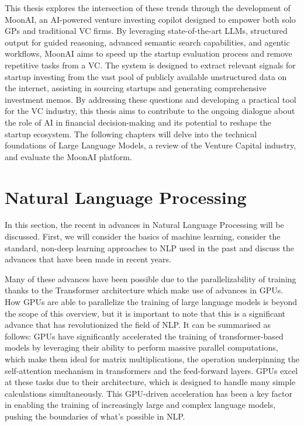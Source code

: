 \documentclass[a4paper, oneside]{discothesis}
\begin{document}
This thesis explores the intersection of these trends through the development of MoonAI, an
AI-powered venture investing copilot designed to empower both solo GPs and traditional VC firms.
By leveraging state-of-the-art LLMs, structured output for guided reasoning, advanced
semantic search capabilities, and agentic workflows, MoonAI aims to speed up the startup evaluation process and remove repetitive tasks from a VC. The
system is designed to extract relevant signals for startup investing from the vast pool of
publicly available unstructured data on the internet, assisting in sourcing startups and
generating comprehensive investment memos. By addressing these questions and developing a practical tool for the VC industry, this thesis
aims to contribute to the ongoing dialogue about the role of AI in financial decision-making and
its potential to reshape the startup ecosystem. The following chapters will delve into the
technical foundations of Large Language Models, a review of the Venture Capital industry, and evaluate the MoonAI platform. 

\chapter{Natural Language Processing}

In this section, the recent in advances in Natural Language Processing will be discussed. First, we will consider the basics of machine learning, 
consider the standard, non-deep learning approaches to NLP used in the past and discuss the advances that have been made in recent years.

Many of these advances have been possible due to the parallelizability of training thanks to the Transformer architecture which make use of advances in GPUs. 
How GPUs are able to parallelize the training of large language models is beyond the scope of this overview, but it is important to note that this is a significant
advance that has revolutionized the field of NLP. It can be summarised as follows: GPUs have significantly accelerated the training of transformer-based models by leveraging their ability to perform massive parallel computations, which make them ideal for matrix multiplications, the operation underpinning the self-attention mechanism in transformers and the feed-forward layers. 
GPUs excel at these tasks due to their architecture, which is designed to handle many simple calculations simultaneously.
This GPU-driven acceleration has been a key factor in enabling the training of increasingly large and complex language models, pushing the boundaries of what's possible in NLP.
\end{document}

